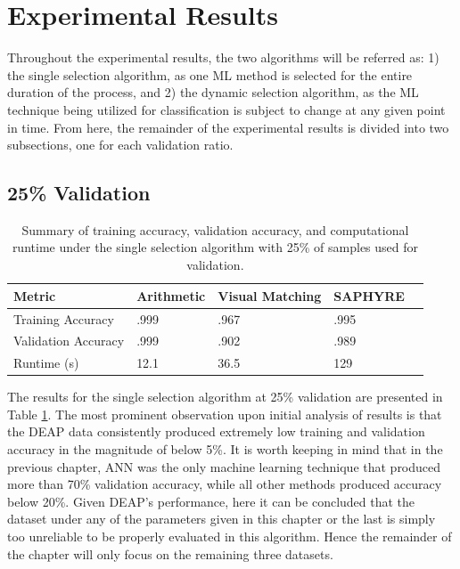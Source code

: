 \documentclass[12pt]{uthesis-v12}  %
\begin{document}
\section{Experimental Results}

Throughout the experimental results, the two algorithms will be referred as: 1) the single selection algorithm, as one ML method is selected for the entire duration of the process, and 2) the dynamic selection algorithm, as the ML technique being utilized for classification is subject to change at any given point in time. From here, the remainder of the experimental results is divided into two subsections, one for each validation ratio.

\subsection{25\% Validation}

\begin{table}[!t]
\caption{Summary of training accuracy, validation accuracy, and computational runtime under the single selection algorithm with 25\% of samples used for validation.}
\renewcommand{\arraystretch}{1.3}
\centering
{\begin{tabular}{*{5}{l}}
\toprule
Metric & Arithmetic & Visual Matching & SAPHYRE \\ \midrule
Training Accuracy & .999 & .967 & .995 \\
Validation Accuracy & .999 & .902 & .989 \\
Runtime (s) & 12.1 & 36.5 & 129 \\ \bottomrule
\end{tabular}}

\label{single-all}
\end{table}

The results for the single selection algorithm at 25\% validation are presented in Table \ref{single-all}. The most prominent observation upon initial analysis of results is that the DEAP data consistently produced extremely low training and validation accuracy in the magnitude of below 5\%. It is worth keeping in mind that in the previous chapter, ANN was the only machine learning technique that produced more than 70\% validation accuracy, while all other methods produced accuracy below 20\%. Given DEAP's performance, here it can be concluded that the dataset under any of the parameters given in this chapter or the last is simply too unreliable to be properly evaluated in this algorithm. Hence the remainder of the chapter will only focus on the remaining three datasets.
\end{document}
